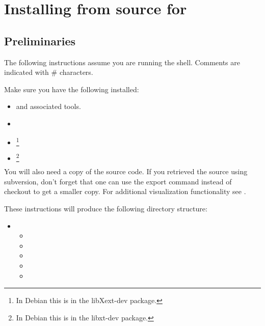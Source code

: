 %
%
%

\section{Installing from source for \linux}
\label{sec:srclinux}

\subsection{Preliminaries}

The following instructions assume you are running the  shell.
Comments are indicated with \# characters.

Make sure you have the following installed:
\begin{itemize}
 \item {} and associated tools.
 \item {}
 \item {}\footnote{In Debian this is in the libXext-dev package.}
 \item {}\footnote{In Debian this is in the libxt-dev package.}
\end{itemize}

You will also need a copy of the \esfinley source code.
If you retrieved the source using subversion, don't forget that one can use the export command instead of checkout to get a smaller copy.
For additional visualization functionality see .

These instructions will produce the following directory structure:
\begin{itemize}
 \item[]  \begin{itemize}
  \item[] 
  \item[] 
  \item[] 
  \item[] 
  \item[] 
 \end{itemize}
\end{itemize}

